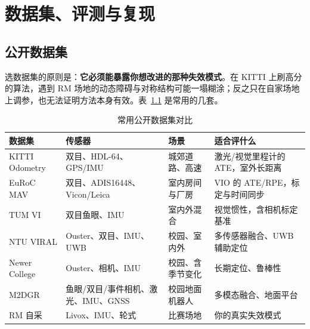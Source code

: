 \chapter{数据集、评测与复现}\label{ch:28-evaluation}
\usetikzlibrary{arrows.meta}


\section{公开数据集}\label{sec:28-datasets}

选数据集的原则是：\textbf{它必须能暴露你想改进的那种失效模式}。在 KITTI 上刷高分的算法，遇到 RM 场地的动态障碍与对称结构可能一塌糊涂；反之只在自家场地上调参，也无法证明方法本身有效。表~\ref{tab:28-datasets} 是常用的几套。

\begin{table}[htbp]
  \centering
  \caption{常用公开数据集对比}\label{tab:28-datasets}
  \footnotesize
  \begin{tabular}{p{2.3cm}p{4.2cm}p{3.4cm}p{4.0cm}}
    \toprule
    数据集 & 传感器 & 场景 & 适合评什么 \\
    \midrule
    KITTI Odometry & 双目、HDL-64、GPS/IMU & 城郊道路、高速 & 激光/视觉里程计的 ATE，室外长距离 \\
    EuRoC MAV & 双目、ADIS16448、Vicon/Leica & 室内房间与厂房 & VIO 的 ATE/RPE，标定与时间同步 \\
    TUM VI & 双目鱼眼、IMU & 室内外混合 & 视觉惯性，含相机标定基准 \\
    NTU VIRAL & Ouster、双目、IMU、UWB & 校园、室内外 & 多传感器融合、UWB 辅助定位 \\
    Newer College & Ouster、相机、IMU & 校园、含季节变化 & 长期定位、鲁棒性 \\
    M2DGR & 鱼眼/双目/事件相机、激光、IMU、GNSS & 校园地面机器人 & 多模态融合、地面平台 \\
    RM 自采 & Livox、IMU、轮式 & 比赛场地 & 你的真实失效模式 \\
    \bottomrule
  \end{tabular}
\end{table}

